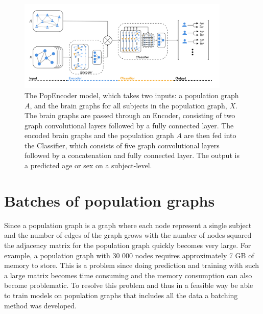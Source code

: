 \begin{figure}[H]
    \centering
    \includegraphics[width=0.9\textwidth]{chapters/images_methods/popencoder_v2.png}
    \caption{The PopEncoder model, which takes two inputs: a population graph $A$, and the brain graphs for all subjects in the population graph, $X$. The brain graphs are passed through an Encoder, consisting of two graph convolutional layers followed by a fully connected layer. The encoded brain graphs and the population graph $A$ are then fed into the Classifier, which consists of five graph convolutional layers followed by a concatenation and fully connected layer. The output is a predicted age or sex on a subject-level.}
    \label{fig:popencoder}
\end{figure}

\section{Batches of population graphs}
Since a population graph is a graph where each node represent a single subject and the number of edges of the graph grows with the number of nodes squared the adjacency matrix for the population graph quickly becomes very large. For example, a population graph with 30 000 nodes requires approximately 7 GB of memory to store. This is a problem since doing prediction and training with such a large matrix becomes time consuming and the memory consumption can also become problematic. To resolve this problem and thus in a feasible way be able to train models on population graphs that includes all the data a batching method was developed. 


